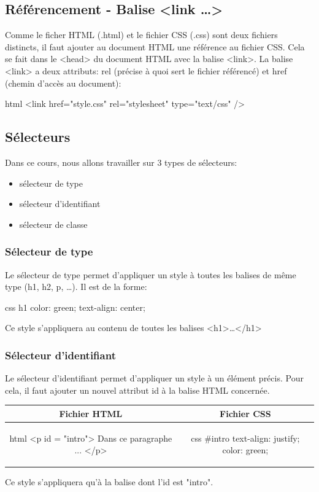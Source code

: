 \documentclass[a4paper,11pt]{article}
\begin{document}
\subsection{Référencement - Balise <link \dots>}
Comme le ficher HTML (.html) et le fichier CSS (.css) sont deux fichiers distincts, il faut ajouter au document HTML une référence au fichier CSS. Cela se fait dans le <head> du document HTML avec la balise <link>.
La balise <link> a deux attributs: rel (précise à quoi sert le fichier référencé) et href (chemin d'accès au document):
\begin{code}{html}
<link href="style.css" rel="stylesheet" type="text/css" />
\end{code}

\subsection{Sélecteurs}
Dans ce cours, nous allons travailler sur 3 types de sélecteurs:
\begin{itemize}
\item sélecteur de type
\item sélecteur d'identifiant
\item sélecteur de classe
\end{itemize}

\subsubsection{Sélecteur de type}
Le sélecteur de type permet d'appliquer un style à toutes les balises de même type (h1, h2, p, \dots).
Il est de la forme: \par
\begin{code}{css}
h1 {
  color: green;
  text-align: center;
}
\end{code}\par
Ce style s'appliquera au contenu de toutes les balises <h1>…</h1>

\subsubsection{Sélecteur d'identifiant}
Le sélecteur d'identifiant permet d'appliquer un style à un élément précis. Pour cela, il faut ajouter un nouvel attribut id à la balise HTML concernée.\par

\begin{tabular}{|c|c|}
\hline
\centering Fichier HTML & Fichier CSS\tabularnewline
\hline
\begin{minipage}{1\textwidth}
\begin{code}{html}
<p id = "intro">
  Dans ce paragraphe ...
</p>
\end{code}
\end{minipage}&
\begin{minipage}{1\textwidth}
\begin{code}{css}
#intro{
  text-align: justify;
  color: green;
}
\end{code}
\end{minipage}\tabularnewline
\hline
\end{tabular}\par
Ce style s'appliquera qu'à la balise dont l'id est "intro".
\end{document}
